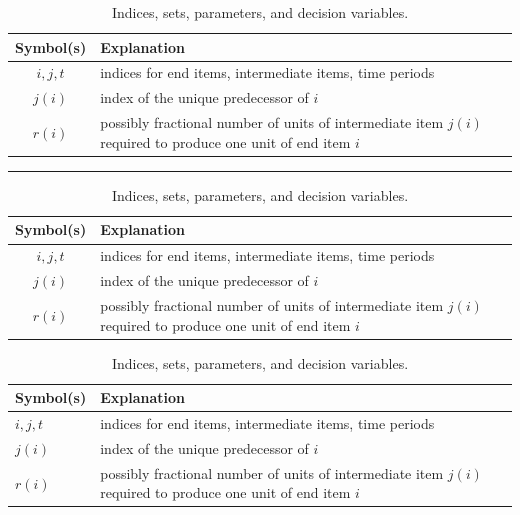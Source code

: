 \documentclass{article}
\begin{document}
\newpage


\lipsum[1][1-3]

\begin{table}[h]
\centering
\caption{Indices, sets, parameters, and decision variables.}
\begin{tabular}{c l}
\hline
Symbol(s)	& Explanation \\
\hline
$i, j, t$	& indices for end items, intermediate items, time periods \\
$j(i)$	& index of the unique predecessor of $i$ \\
$r(i)$	& possibly fractional number of units of intermediate item $j(i)$ required to produce one unit of end item $i$ \\
\hline
\end{tabular}
\end{table}

\lipsum[1][4-5]

\bigskip
\hrule
\bigskip

\lipsum[1][1-3]

\begin{table}[h]
\centering
\caption{Indices, sets, parameters, and decision variables.}
\begin{tabular}{c p{7 cm}} %
\hline
Symbol(s)	& Explanation \\
\hline
$i, j, t$	& indices for end items, intermediate items, time periods \\
$j(i)$	& index of the unique predecessor of $i$ \\
$r(i)$	& possibly fractional number of units of intermediate item $j(i)$ required to produce one unit of end item $i$ \\
\hline
\end{tabular}
\end{table}

\lipsum[1][4-5]

\newpage


\lipsum[1][1-3]

\begin{table}[h]
\centering
\caption{Indices, sets, parameters, and decision variables.}
\label{tab:notation}
\begin{tabularx}{\textwidth}{X X}
\hline
Symbol(s)	& Explanation \\
\hline
$i, j, t$	& indices for end items, intermediate items, time periods \\
$j(i)$	& index of the unique predecessor of $i$ \\
$r(i)$	& possibly fractional number of units of intermediate item $j(i)$ required to produce one unit of end item $i$ \\
\hline
\end{tabularx}
\end{table}
\end{document}
